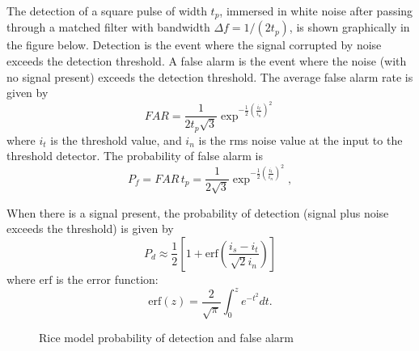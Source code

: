 The detection of a square pulse of width $t_p$, immersed in white noise after passing through a matched filter with bandwidth $\Delta f=1/(2 t_p)$, is shown graphically in the figure below. Detection is the event where the signal corrupted by noise exceeds the detection threshold. A false alarm is the event where the noise (with no signal present) exceeds the detection threshold.
The average false alarm rate is given by
\begin{equation}
FAR=
\frac{1}{2  t_p \sqrt{3}}\exp^{-\frac{1}{2}\left(\frac{i_t}{i_n}\right)^2}
\end{equation}
where
$i_t$ is the threshold value, and
$i_n$ is the rms noise value at the input to the threshold detector.  The probability of false alarm is 
\begin{equation}
P_f = {FAR\, t_p}=
\frac{1}{2 \sqrt{3}}\exp^{-\frac{1}{2}\left(\frac{i_t}{i_n}\right)^2},
\end{equation}

When there is a signal present, the probability of detection (signal plus noise exceeds the threshold) is given by
\begin{equation}
P_d \approx
\frac{1}{2}\left[
1+{\textrm{erf}}\left(
\frac{i_s-i_t}{\sqrt{2}i_n}
\right)
\right]
\end{equation}
where ${\textrm{erf}}$ is the error function:
\begin{equation}
{\textrm{erf}}(z)=\frac{2}{\sqrt{\pi}}\int_0^z e^{-t^2}dt.
\end{equation}

\begin{figure}[t]
\centering
{}
\caption{Rice model probability of detection and false alarm\label{noiseprob01}}
\end{figure}


